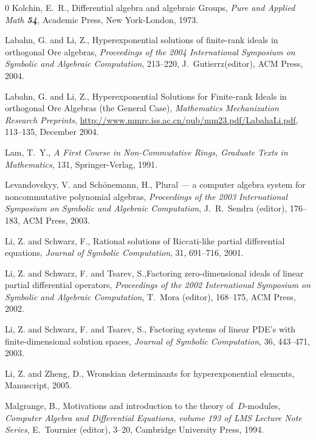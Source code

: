 \begin{thebibliography}{0}
Kolchin, E.~R., Differential algebra and algebraic Groups, {\em
Pure and Applied Math {\bf 54}}, Academic Press, New York-London,
1973.


Labahn, G. and Li, Z., Hyperexponential solutions of finite-rank
ideals in orthogonal {O}re algebras, {\em Proceedings of the 2004
International Symposium on Symbolic and Algebraic Computation},
213--220, J.~Gutierrz(editor), ACM Press, 2004.

Labahn, G. and Li, Z., Hyperexponential Solutions for Finite-rank
Ideals in orthogonal {O}re Algebras (the General Case), {\em
Mathematics Mechanization Research Preprints},
\url{http://www.mmrc.iss.ac.cn/pub/mm23.pdf/LabahaLi.pdf},
113--135, December 2004.


Lam, T.~Y., {\em A First Course in Non-{C}ommutative Rings,
Graduate Texts in Mathematics},  131, Springer-Verlag, 1991.






Levandovskyy, V. and Sch{\"o}nemann, H., Plural --- a computer
algebra system for noncommutative  polynomial algebras, {\em
Proceedings of the 2003 International Symposium on Symbolic and
Algebraic Computation}, J.~R.~Sendra (editor), 176--183, ACM
Press, 2003.


Li, Z. and Schwarz, F., Rational solutions of {R}iccati-like
partial differential equations, {\em Journal of Symbolic
Computation}, 31, 691--716, 2001.


Li, Z. and Schwarz, F. and Tsarev, S.,Factoring zero-dimensional
ideals of linear partial differential operators, {\em Proceedings
of the 2002 International Symposium on Symbolic and Algebraic
Computation}, T.~Mora (editor), 168--175, ACM Press, 2002.



Li, Z. and Schwarz, F. and Tsarev, S., Factoring systems of linear
{PDE}'s with finite-dimensional solution spaces, {\em Journal of
Symbolic Computation}, 36, 443--471, 2003.

Li, Z. and Zheng, D., Wronskian determinants for hyperexponential
elements, Manuscript, 2005.

Malgrange, B., Motivations and introduction to the theory
of~{$D$}-modules, {\em Computer Algebra and Differential
Equations, {\rm volume 193 of } LMS Lecture Note Series},
E.~Tournier (editor), 3--20, Cambridge University Press, 1994.


\end{thebibliography}

